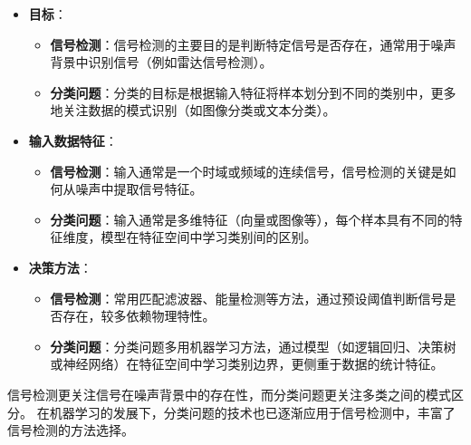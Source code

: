 \documentclass[12pt]{ctexart}
\begin{document}
\begin{itemize}
    \item \textbf{目标}：
    \begin{itemize}
        \item \textbf{信号检测}：信号检测的主要目的是判断特定信号是否存在，通常用于噪声背景中识别信号（例如雷达信号检测）。
        \item \textbf{分类问题}：分类的目标是根据输入特征将样本划分到不同的类别中，更多地关注数据的模式识别（如图像分类或文本分类）。
    \end{itemize}

    \item \textbf{输入数据特征}：
    \begin{itemize}
        \item \textbf{信号检测}：输入通常是一个时域或频域的连续信号，信号检测的关键是如何从噪声中提取信号特征。
        \item \textbf{分类问题}：输入通常是多维特征（向量或图像等），每个样本具有不同的特征维度，模型在特征空间中学习类别间的区别。
    \end{itemize}

    \item \textbf{决策方法}：
    \begin{itemize}
        \item \textbf{信号检测}：常用匹配滤波器、能量检测等方法，通过预设阈值判断信号是否存在，较多依赖物理特性。
        \item \textbf{分类问题}：分类问题多用机器学习方法，通过模型（如逻辑回归、决策树或神经网络）在特征空间中学习类别边界，更侧重于数据的统计特征。
    \end{itemize}

    
\end{itemize}

信号检测更关注信号在噪声背景中的存在性，而分类问题更关注多类之间的模式区分。
在机器学习的发展下，分类问题的技术也已逐渐应用于信号检测中，丰富了信号检测的方法选择。

\newpage
\end{document}
